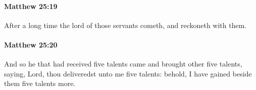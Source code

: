 		\paragraph{Matthew 25:19} %
			\label{MATTHEW-25-19}

			After a long time the lord of those servants cometh, and reckoneth with them.

			\begin{framed}
			\scriptsize
				\begin{compactdesc}
					\item[SBLG] 
				\end{compactdesc}
			\end{framed}

		\paragraph{Matthew 25:20} %
			\label{MATTHEW-25-20}

			And so he that had received five talents came and brought other five talents, saying, Lord, thou deliveredst unto me five talents: behold, I have gained beside them five talents more.

